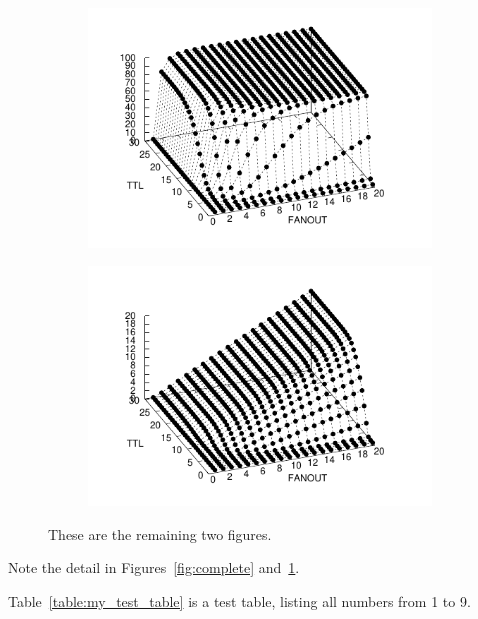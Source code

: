 \begin{figure}[h]
  \centering
  \begin{subfigure}[b]{0.45\linewidth}
    \includegraphics{figs/hitratio.pdf}
  \end{subfigure}
  \hspace{1cm}
  \begin{subfigure}[b]{0.45\linewidth}
    \includegraphics{figs/redundant.pdf}
  \end{subfigure}
  \caption{These are the remaining two figures.}
  \label{fig:others}
\end{figure}

Note the detail in Figures~\ref{fig:complete} and~\ref{fig:others}.




Table~\ref{table:my_test_table} is a test table, listing all numbers from 1 to 9.

